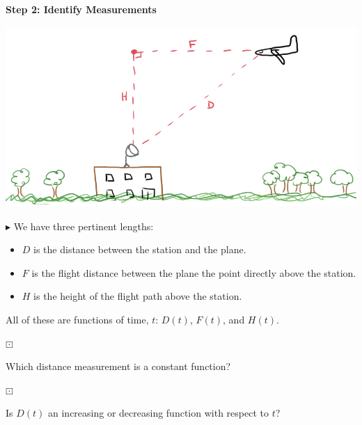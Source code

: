 \documentclass{ximera}
\begin{document}
\textbf{\textcolor{purple!85!blue}{Step 2: Identify Measurements}}



\begin{image}
\includegraphics{pics/plane_2.png}
\end{image}



$\blacktriangleright$ We have three pertinent lengths:

\begin{itemize}
\item $D$ is the distance between the station and the plane.
\item $F$ is the flight distance between the plane the point directly above the station.
\item $H$ is the height of the flight path above the station.
\end{itemize}

All of these are functions of time, $t$: $D(t)$, $F(t)$, and $H(t)$.


\begin{question} $\boxdot$ 

Which distance measurement is a constant function?

\begin{multipleChoice}
\end{multipleChoice}

\end{question}



\begin{question} $\boxdot$ 

Is $D(t)$ an increasing or decreasing function with respect to $t$?

\begin{multipleChoice}
\end{multipleChoice}

\end{question}
\end{document}
